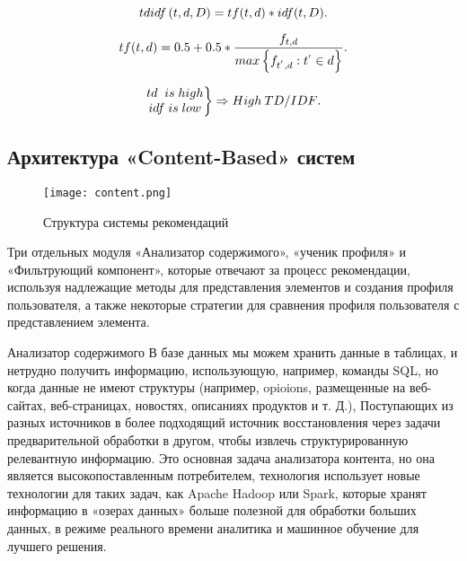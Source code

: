 \begin{equation}
tdidf\left ( t,d,D \right )=tf(t,d)*idf(t,D)\\.
\label{F:F7}
\end{equation}

\begin{equation}
tf(t,d)=0.5+0.5*\frac{f_{t,d}}{max\left \{ f_{t^{'},d}:t^{'}\in d \right \}}\\.
\label{F:F8}
\end{equation}

\begin{equation}
\left. \begin{matrix}
td \;\;  is\; high\\ 
idf\; is \;low
\end{matrix} \right \} \Rightarrow High\: TD/IDF\\.
\label{F:F9}
\end{equation}
\newpage
\subsection{Архитектура «Content-Based» систем}

\begin{figure}[h]
  \centering
  \texttt{[image: content.png]}
  \caption{Структура системы рекомендаций}
  \label{image:scheme8}
\end{figure}
Три отдельных модуля «Анализатор содержимого», «ученик профиля» и «Фильтрующий компонент», которые отвечают за процесс рекомендации, используя надлежащие методы для представления элементов и создания профиля пользователя, а также некоторые стратегии для сравнения профиля пользователя с представлением элемента.

Анализатор содержимого
В базе данных мы можем хранить данные в таблицах, и нетрудно получить информацию, использующую, например, команды SQL, но когда данные не имеют структуры (например, opioions, размещенные на веб-сайтах, веб-страницах, новостях, описаниях продуктов и т. Д.), Поступающих из разных источников в более подходящий источник восстановления через задачи предварительной обработки в другом, чтобы извлечь структурированную релевантную информацию. Это основная задача анализатора контента, но она является высокопоставленным потребителем, технология использует новые технологии для таких задач, как Apache Hadoop или Spark, которые хранят информацию в «озерах данных» \cite{lakes} больше полезной для обработки больших данных, в режиме реального времени аналитика и машинное обучение для лучшего решения.


